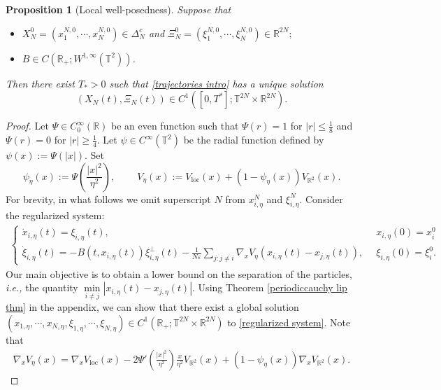 \documentclass[10pt,a4paper]{amsart}
\newtheorem{prop}{Proposition}
\begin{document}
\begin{prop}[Local well-posedness]\label{Short time well posed}
Suppose that
\begin{itemize}
\item[{\rm(i)}]$X_{N}^{0}=(x_{1}^{N,0},\cdots\!,x_{N}^{N,0})\in \Delta_{N}^{c}$ and $\Xi_{N}^{0}=(\xi_{1}^{N,0},\cdots\!,\xi_{N}^{N,0})\in \mathbb{R}^{2N};$
\smallskip
\item[{\rm(ii)}] $B\in C(\mathbb{R}_{+};W^{1,\infty}(\mathbb{T}^{2}))$. 
\end{itemize}
Then there exist $T_{\ast}>0$ such that \eqref{trajectories intro} 
has a unique solution 
$$
(X_{N}(t),\Xi_{N}(t))\in C^{1}([0,T^{\ast}];\mathbb{T}^{2N}\times \mathbb{R}^{2N}).
$$ 
\end{prop}

\begin{proof}
Let $\Psi\in C^{\infty}_{0}(\mathbb{R})$ be an even function such that $\Psi(r)=1$ for $\left| r \right|\leq \frac{1}{8}$ and $\Psi(r)=0$ for $\left| r \right|\geq \frac{1}{4}$. 
Let $\psi\in C^{\infty}(\mathbb{T}^{2})$ be the radial function defined 
by $\psi(x) := \Psi(\left| x \right|)$. Set  
\[
\psi_{\eta}(x):=\Psi(\frac{\left|x\right|^{2}}{\eta^{2}}), \qquad\ 
V_{\eta}(x):= V_{\mathrm{loc}}(x)+(1-\psi_{\eta}(x))V_{\mathbb{R}^{2}}(x). 
\]
For brevity, in what follows we omit superscript $N$ from $x_{i,\eta}^{N}$ and $\xi_{i,\eta}^{N}$. Consider the regularized system: 
\begin{align}
\begin{cases}
\dot x_{i,\eta}(t)=\xi_{i,\eta}(t),\ &x_{i,\eta}(0)=x_{i}^{0}\\[1mm]
\dot \xi_{i,\eta}(t)=-B(t,x_{i,\eta}(t))\xi_{i,\eta}^{\perp}(t)-\frac{1}{N\varepsilon}\underset{j:j\neq i}{\sum}\nabla_{x} V_{\eta}(x_{i,\eta}(t)-x_{j,\eta}(t)), \,\,\, &\xi_{i,\eta}(0)=\xi_{i}^{0}. 
\end{cases}
\label{regularized system}
\end{align}
Our main objective is to obtain a lower bound on the separation of the particles, {\it i.e.,} the quantity $\underset{i\neq j}{\min}\left\vert x_{i,\eta}(t)-x_{j,\eta}(t)\right\vert$. 
Using Theorem \ref{periodiccauchy lip thm} in the appendix, we can show that there exist a  global solution $(x_{1,\eta},\cdots\!,x_{N,\eta},\xi_{1,\eta},\cdots\!,\xi_{N,\eta})\in C^{1}(\mathbb{R}_{+};\mathbb{T}^{2N}\times \mathbb{R}^{2N})$ to \eqref{regularized system}. Note that 
\begin{align*}
\nabla_{x} V_{\eta}(x)=\nabla_{x}V_{\mathrm{loc}}(x)-2\Psi'(\frac{\left\vert x\right\vert^{2}}{\eta^{2}})\frac{x}{\eta^{2}}V_{\mathbb{R}^{2}}(x)+(1-\psi_{\eta}(x))\nabla_{x} V_{\mathbb{R}^{2}}(x). \end{align*}

\end{proof}
\end{document}
